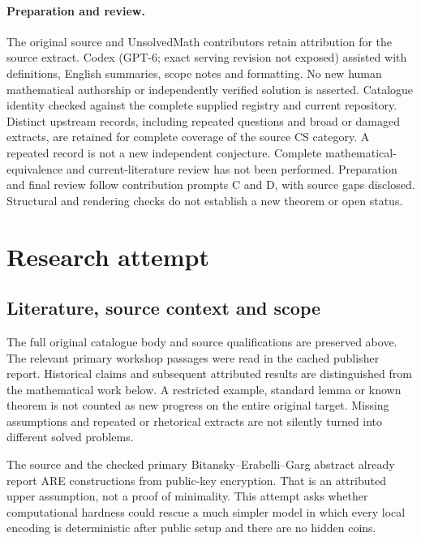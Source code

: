 \documentclass[11pt]{article}
\begin{document}
\paragraph{Preparation and review.}
The original source and UnsolvedMath contributors retain attribution for the source extract. Codex (GPT-6; exact serving revision not exposed) assisted with definitions, English summaries, scope notes and formatting. No new human mathematical authorship or independently verified solution is asserted. Catalogue identity checked against the complete supplied registry and current repository. Distinct upstream records, including repeated questions and broad or damaged extracts, are retained for complete coverage of the source CS category. A repeated record is not a new independent conjecture. Complete mathematical-equivalence and current-literature review has not been performed. Preparation and final review follow contribution prompts C and D, with source gaps disclosed. Structural and rendering checks do not establish a new theorem or open status.
\label{end:statement}

\section{Research attempt}
\subsection{Literature, source context and scope}
The full original catalogue body and source qualifications are preserved above. The relevant primary workshop passages were read in the cached publisher report. Historical claims and subsequent attributed results are distinguished from the mathematical work below. A restricted example, standard lemma or known theorem is not counted as new progress on the entire original target. Missing assumptions and repeated or rhetorical extracts are not silently turned into different solved problems.

The source and the checked primary Bitansky--Erabelli--Garg abstract already report ARE constructions from public-key encryption. That is an attributed upper assumption, not a proof of minimality. This attempt asks whether computational hardness could rescue a much simpler model in which every local encoding is deterministic after public setup and there are no hidden coins.
\end{document}

